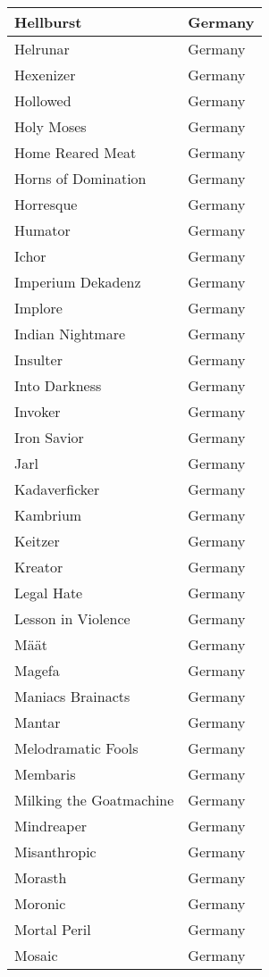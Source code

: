 \documentclass[12pt, a4paper, twoside]{report}
\begin{document}
\begin{center}
\begin{longtable}{|p{5cm}|p{5cm}|}
Hellburst & Germany \\ \hline
Helrunar & Germany \\ \hline
Hexenizer & Germany \\ \hline
Hollowed & Germany \\ \hline
Holy Moses & Germany \\ \hline
Home Reared Meat & Germany \\ \hline
Horns of Domination & Germany \\ \hline
Horresque & Germany \\ \hline
Humator & Germany \\ \hline
Ichor & Germany \\ \hline
Imperium Dekadenz & Germany \\ \hline
Implore & Germany \\ \hline
Indian Nightmare & Germany \\ \hline
Insulter & Germany \\ \hline
Into Darkness & Germany \\ \hline
Invoker & Germany \\ \hline
Iron Savior & Germany \\ \hline
Jarl & Germany \\ \hline
Kadaverficker & Germany \\ \hline
Kambrium & Germany \\ \hline
Keitzer & Germany \\ \hline
Kreator & Germany \\ \hline
Legal Hate & Germany \\ \hline
Lesson in Violence & Germany \\ \hline
Määt & Germany \\ \hline
Magefa & Germany \\ \hline
Maniacs Brainacts & Germany \\ \hline
Mantar & Germany \\ \hline
Melodramatic Fools & Germany \\ \hline
Membaris & Germany \\ \hline
Milking the Goatmachine & Germany \\ \hline
Mindreaper & Germany \\ \hline
Misanthropic & Germany \\ \hline
Morasth & Germany \\ \hline
Moronic & Germany \\ \hline
Mortal Peril & Germany \\ \hline
Mosaic & Germany \\ \hline

\end{longtable}
\end{center}
\end{document}

